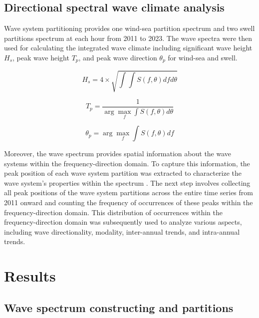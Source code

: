 \subsection{Directional spectral wave climate analysis}
\label{Directional spectral wave climate analysis}

Wave system partitioning provides one wind-sea partition spectrum and two swell
partitions spectrum at each hour from 2011 to 2023. The wave spectra were then
used for calculating the integrated wave climate including significant wave
height $H_s$, peak wave height $T_p$, and peak wave direction $\theta_p$ for
wind-sea and swell.  

\begin{equation}
    H_s=4\times \sqrt{\int \int S(f,\theta)dfd\theta}
\label{eq:eq4.6}
\end{equation}

\begin{equation}
    T_p=\frac{1}{\arg\max_f \int S(f,\theta)d\theta}
\label{eq:eq4.7}
\end{equation}

\begin{equation}
    \theta_p=\arg\max_f \int S(f,\theta)df
\label{eq:eq4.8}
\end{equation}


Moreover, the wave spectrum provides spatial information about the wave systems
within the frequency-direction domain. To capture this information, the peak
position of each wave system partition was extracted to characterize the wave
system’s properties within the spectrum \citep{portilla-yandun_wave_2015}. The
next step involves collecting all peak positions of the wave system partitions
across the entire time series from 2011 onward and counting the frequency of
occurrences of these peaks within the frequency-direction domain. This
distribution of occurrences within the frequency-direction domain was
subsequently used to analyze various aspects, including wave directionality,
modality, inter-annual trends, and intra-annual trends.

\section{Results}
\label{c4_results}

\subsection{Wave spectrum constructing and partitions}
\label{Wave spectrum constructing and partitions}

